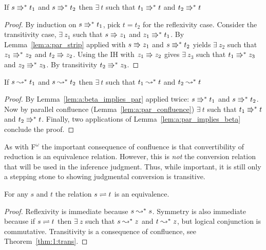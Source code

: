 \begin{lemma}
    \label{lem:a:par_confluence}
    If $s \Rrightarrow^* t_1$ and $s \Rrightarrow^* t_2$ then $\exists\ t$ such that $t_1 \Rrightarrow^* t$ and $t_2 \Rrightarrow^* t$
\end{lemma}
\begin{proof}
    By induction on $s \Rrightarrow^* t_1$, pick $t = t_2$ for the reflexivity case.
    Consider the transitivity case, $\exists\ z_1$ such that $s \Rrightarrow z_1$ and $z_1 \Rrightarrow^* t_1$.
    By Lemma~\ref{lem:a:par_strip} applied with $s \Rrightarrow z_1$ and $s \Rrightarrow^* t_2$ yields $\exists\ z_2$ such that $z_1 \Rrightarrow^* z_2$ and $t_2 \Rrightarrow z_2$.
    Using the IH with $z_1 \Rrightarrow z_2$ gives $\exists\ z_3$ such that $t_1 \Rrightarrow^* z_3$ and $z_2 \Rrightarrow^* z_3$.
    By transitivity $t_2 \Rrightarrow^* z_3$.
\end{proof}

\begin{lemma}[Confluence]
    If $s \leadsto^* t_1$ and $s \leadsto^* t_2$ then $\exists\ t$ such that $t_1 \leadsto^* t$ and $t_2 \leadsto^* t$
\end{lemma}
\begin{proof}
    By Lemma~\ref{lem:a:beta_implies_par} applied twice: $s \Rrightarrow^* t_1$ and $s \Rrightarrow^* t_2$.
    Now by parallel confluence (Lemma~\ref{lem:a:par_confluence}) $\exists\ t$ such that $t_1 \Rrightarrow^* t$ and $t_2 \Rrightarrow^* t$.
    Finally, two applications of Lemma~\ref{lem:a:par_implies_beta} conclude the proof.
\end{proof}

As with F$^\omega$ the important consequence of confluence is that convertibility of reduction is an equivalence relation.
However, this is \textit{not} the conversion relation that will be used in the inference judgment.
Thus, while important, it is still only a stepping stone to showing judgmental conversion is transitive.

\begin{theorem}
    For any $s$ and $t$ the relation $s \rightleftharpoons t$ is an equivalence.
    \label{lem:2:beta_conv_equivalence}
\end{theorem}
\begin{proof}
    Reflexivity is immediate because $s \leadsto^* s$.
    Symmetry is also immediate because if $s \rightleftharpoons t$ then $\exists\ z$ such that $s \leadsto^* z$ and $t \leadsto^* z$, but logical conjunction is commutative.
    Transitivity is a consequence of confluence, see Theorem~\ref{thm:1:trans}.
\end{proof}

